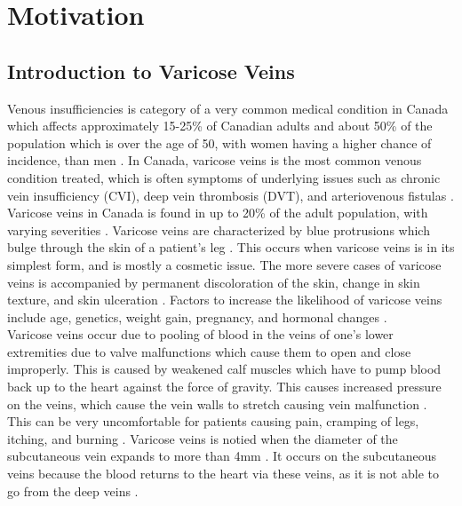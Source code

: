 \documentclass[11.5pt]{article}
\begin{document}
\pagebreak

\thispagestyle{empty}
\tableofcontents
\listoffigures
\listoftables
\newpage


\section{Motivation}
\subsection{Introduction to Varicose Veins}
Venous insufficiencies is category of a very common medical condition in Canada which affects approximately 15-25\% of Canadian adults and about 50\% of the population which is over the age of 50, with women having a higher chance of incidence, than men \cite{CVC}. In Canada, varicose veins is the most common venous condition treated, which is often symptoms of underlying issues such as chronic vein insufficiency (CVI), deep vein thrombosis (DVT), and arteriovenous fistulas \cite{CVC}. Varicose veins in Canada is found in up to 20\% of the adult population, with varying severities \cite{CSVS}. Varicose veins are characterized by blue protrusions which bulge through the skin of a patient's leg \cite{CSVS}. This occurs when varicose veins is in its simplest form, and is mostly a cosmetic issue. The more severe cases of varicose veins is accompanied by permanent discoloration of the skin, change in skin texture, and skin ulceration \cite{CSVS}. Factors to increase the likelihood of varicose veins include age, genetics, weight gain, pregnancy, and hormonal changes \cite{CSVS2}. \\

Varicose veins occur due to pooling of blood in the veins of one's lower extremities due to valve malfunctions which cause them to open and close improperly. This is caused by weakened calf muscles which have to pump blood back up to the heart against the force of gravity. This causes increased pressure on the veins, which cause the vein walls to stretch causing vein malfunction \cite{CSVS2}. This can be very uncomfortable for patients causing pain, cramping of legs, itching, and burning \cite{CSVS2}. Varicose veins is notied when the diameter of the subcutaneous vein expands to more than 4mm \cite{CSVS}. It occurs on the subcutaneous veins because the blood returns to the heart via these veins, as it is not able to go from the deep veins \cite{CSVS2}.\\
\end{document}
